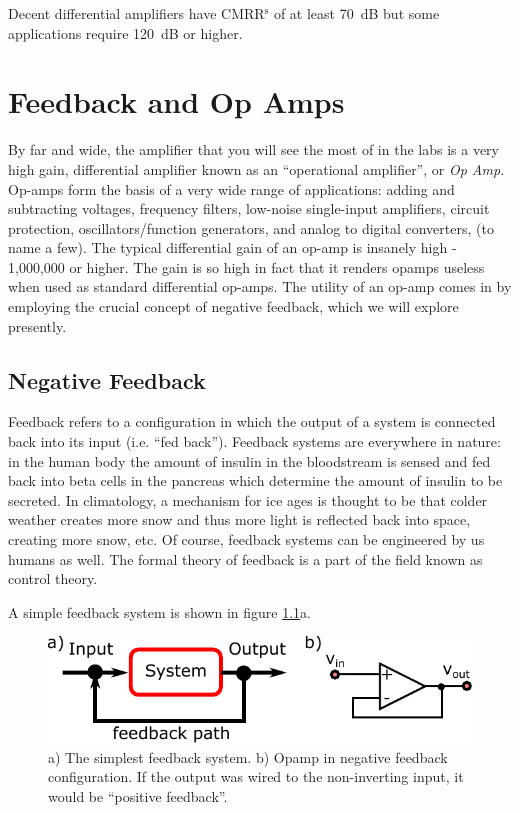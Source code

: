 \documentclass{tufte-book}
\begin{document}
Decent differential amplifiers have CMRR$^\text{s}$ of at least 70~dB but some applications require 120~dB or higher.

\chapter{Feedback and Op Amps}
By far and wide, the amplifier that you will see the most of in the labs is a very high gain, differential amplifier known as an ``operational amplifier'', or \textit{Op Amp}. Op-amps form the basis of a very wide range of applications: adding and subtracting voltages, frequency filters, low-noise single-input amplifiers, circuit protection, oscillators/function generators, and analog to digital converters, (to name a few). The typical differential gain of an op-amp is insanely high - 1,000,000 or higher. The gain is so high in fact that it renders opamps useless when used as standard differential op-amps. The utility of an op-amp comes in by employing the crucial concept of negative feedback, which we will explore presently.

\section{Negative Feedback}
Feedback refers to a configuration in which the output of a system is connected back into its input (i.e. ``fed back''). Feedback systems are everywhere in nature: in the human body the amount of insulin in the bloodstream is sensed and fed back into beta cells in the pancreas which determine the amount of insulin to be secreted. In climatology, a mechanism for ice ages is thought to be that colder weather creates more snow and thus more light is reflected back into space, creating more snow, etc. Of course, feedback systems can be engineered by us humans as well. The formal theory of feedback is a part of the field known as control theory.

A simple feedback system is shown in figure \ref{fig:simple_feedback}a.

\begin{figure}[ht]
\caption{a) The simplest feedback system. b) Opamp in negative feedback configuration. If the output was wired to the non-inverting input, it would be ``positive feedback''.}
\label{fig:simple_feedback}
\begin{center}
\includegraphics[]{Images/simple_feedback.pdf}
\end{center}
\end{figure}
\end{document}
